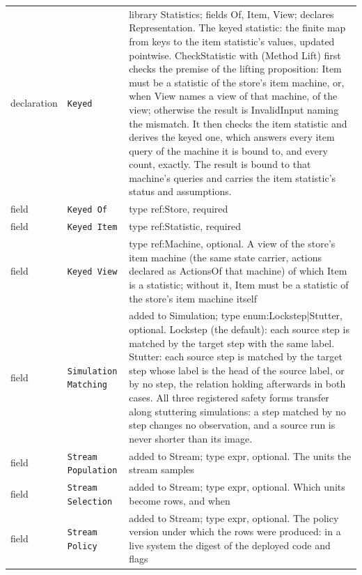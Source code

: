 \documentclass[11pt]{article}
\newcommand{\code}[1]{\texttt{#1}}
\theoremstyle{definition}
\theoremstyle{plain}
\begin{document}
\begin{footnotesize}
\begin{longtable}{>{\raggedright\arraybackslash}p{1.9cm}>{\raggedright\arraybackslash}p{3.3cm}>{\raggedright\arraybackslash}p{9.0cm}}
declaration & \code{Keyed} & library Statistics; fields Of, Item, View; declares Representation. The keyed statistic:\allowbreak{} the finite map from keys to the item statistic's values, updated pointwise.  CheckStatistic with (Method Lift) first checks the premise of the lifting proposition:\allowbreak{} Item must be a statistic of the store's item machine, or, when View names a view of that machine, of the view; otherwise the result is InvalidInput naming the mismatch.  It then checks the item statistic and derives the keyed one, which answers every item query of the machine it is bound to, and every count, exactly.  The result is bound to that machine's queries and carries the item statistic's status and assumptions.\\
field & \code{Keyed Of} & type ref:\allowbreak{}Store, required\\
field & \code{Keyed Item} & type ref:\allowbreak{}Statistic, required\\
field & \code{Keyed View} & type ref:\allowbreak{}Machine, optional. A view of the store's item machine (the same state carrier, actions declared as ActionsOf that machine) of which Item is a statistic; without it, Item must be a statistic of the store's item machine itself\\
field & \code{Simulation Matching} & added to Simulation; type enum:\allowbreak{}Lockstep|\allowbreak{}Stutter, optional. Lockstep (the default):\allowbreak{} each source step is matched by the target step with the same label.  Stutter:\allowbreak{} each source step is matched by the target step whose label is the head of the source label, or by no step, the relation holding afterwards in both cases.  All three registered safety forms transfer along stuttering simulations:\allowbreak{} a step matched by no step changes no observation, and a source run is never shorter than its image.\\
field & \code{Stream Population} & added to Stream; type expr, optional. The units the stream samples\\
field & \code{Stream Selection} & added to Stream; type expr, optional. Which units become rows, and when\\
field & \code{Stream Policy} & added to Stream; type expr, optional. The policy version under which the rows were produced:\allowbreak{} in a live system the digest of the deployed code and flags\\

\end{longtable}
\end{footnotesize}
\end{document}
